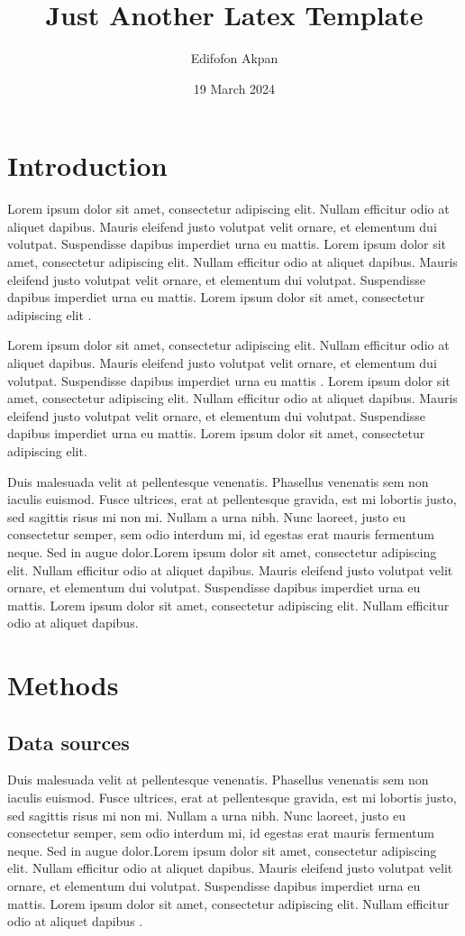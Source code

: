 \documentclass[12pt]{article}
\title{\Huge Just Another Latex Template}
\author{\Large Edifofon Akpan}
\date{\Large 19 March 2024}
\begin{document}
\maketitle


\section{Introduction}
Lorem ipsum dolor sit amet, consectetur adipiscing elit. Nullam efficitur odio at aliquet dapibus. Mauris eleifend justo volutpat velit ornare, et elementum dui volutpat. Suspendisse dapibus imperdiet urna eu mattis. Lorem ipsum dolor sit amet, consectetur adipiscing elit. Nullam efficitur odio at aliquet dapibus. Mauris eleifend justo volutpat velit ornare, et elementum dui volutpat. Suspendisse dapibus imperdiet urna eu mattis. Lorem ipsum dolor sit amet, consectetur adipiscing elit \parencite{Jann2005}. 

Lorem ipsum dolor sit amet, consectetur adipiscing elit. Nullam efficitur odio at aliquet dapibus. Mauris eleifend justo volutpat velit ornare, et elementum dui volutpat. Suspendisse dapibus imperdiet urna eu mattis \parencite{Jann2007}. Lorem ipsum dolor sit amet, consectetur adipiscing elit. Nullam efficitur odio at aliquet dapibus. Mauris eleifend justo volutpat velit ornare, et elementum dui volutpat. Suspendisse dapibus imperdiet urna eu mattis. Lorem ipsum dolor sit amet, consectetur adipiscing elit. 

Duis malesuada velit at pellentesque venenatis. Phasellus venenatis sem non iaculis euismod. Fusce ultrices, erat at pellentesque gravida, est mi lobortis justo, sed sagittis risus mi non mi. Nullam a urna nibh. Nunc laoreet, justo eu consectetur semper, sem odio interdum mi, id egestas erat mauris fermentum neque. Sed in augue dolor.Lorem ipsum dolor sit amet, consectetur adipiscing elit. Nullam efficitur odio at aliquet dapibus. Mauris eleifend justo volutpat velit ornare, et elementum dui volutpat. Suspendisse dapibus imperdiet urna eu mattis. Lorem ipsum dolor sit amet, consectetur adipiscing elit. Nullam efficitur odio at aliquet dapibus.

\section{Methods}
\subsection{Data sources}
Duis malesuada velit at pellentesque venenatis. Phasellus venenatis sem non iaculis euismod. Fusce ultrices, erat at pellentesque gravida, est mi lobortis justo, sed sagittis risus mi non mi. Nullam a urna nibh. Nunc laoreet, justo eu consectetur semper, sem odio interdum mi, id egestas erat mauris fermentum neque. Sed in augue dolor.Lorem ipsum dolor sit amet, consectetur adipiscing elit. Nullam efficitur odio at aliquet dapibus. Mauris eleifend justo volutpat velit ornare, et elementum dui volutpat. Suspendisse dapibus imperdiet urna eu mattis. Lorem ipsum dolor sit amet, consectetur adipiscing elit. Nullam efficitur odio at aliquet dapibus \parencite[see][]{Weber2012}.
\end{document}
